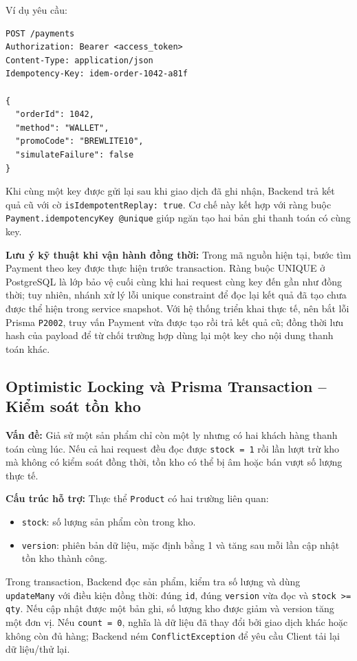 Ví dụ yêu cầu:
\begin{verbatim}
POST /payments
Authorization: Bearer <access_token>
Content-Type: application/json
Idempotency-Key: idem-order-1042-a81f

{
  "orderId": 1042,
  "method": "WALLET",
  "promoCode": "BREWLITE10",
  "simulateFailure": false
}
\end{verbatim}

Khi cùng một key được gửi lại sau khi giao dịch đã ghi nhận, Backend trả kết quả cũ với cờ \texttt{isIdempotentReplay: true}. Cơ chế này kết hợp với ràng buộc \texttt{Payment.idempotencyKey @unique} giúp ngăn tạo hai bản ghi thanh toán có cùng key.

\textbf{Lưu ý kỹ thuật khi vận hành đồng thời:} Trong mã nguồn hiện tại, bước tìm Payment theo key được thực hiện trước transaction. Ràng buộc UNIQUE ở PostgreSQL là lớp bảo vệ cuối cùng khi hai request cùng key đến gần như đồng thời; tuy nhiên, nhánh xử lý lỗi unique constraint để đọc lại kết quả đã tạo chưa được thể hiện trong service snapshot. Với hệ thống triển khai thực tế, nên bắt lỗi Prisma \texttt{P2002}, truy vấn Payment vừa được tạo rồi trả kết quả cũ; đồng thời lưu hash của payload để từ chối trường hợp dùng lại một key cho nội dung thanh toán khác.

\subsection{Optimistic Locking và Prisma Transaction -- Kiểm soát tồn kho}

\textbf{Vấn đề:} Giả sử một sản phẩm chỉ còn một ly nhưng có hai khách hàng thanh toán cùng lúc. Nếu cả hai request đều đọc được \texttt{stock = 1} rồi lần lượt trừ kho mà không có kiểm soát đồng thời, tồn kho có thể bị âm hoặc bán vượt số lượng thực tế.

\textbf{Cấu trúc hỗ trợ:} Thực thể \texttt{Product} có hai trường liên quan:
\begin{itemize}
    \item \texttt{stock}: số lượng sản phẩm còn trong kho.
    \item \texttt{version}: phiên bản dữ liệu, mặc định bằng 1 và tăng sau mỗi lần cập nhật tồn kho thành công.
\end{itemize}

Trong transaction, Backend đọc sản phẩm, kiểm tra số lượng và dùng \texttt{updateMany} với điều kiện đồng thời: đúng \texttt{id}, đúng \texttt{version} vừa đọc và \texttt{stock >= qty}. Nếu cập nhật được một bản ghi, số lượng kho được giảm và version tăng một đơn vị. Nếu \texttt{count = 0}, nghĩa là dữ liệu đã thay đổi bởi giao dịch khác hoặc không còn đủ hàng; Backend ném \texttt{ConflictException} để yêu cầu Client tải lại dữ liệu/thử lại.

